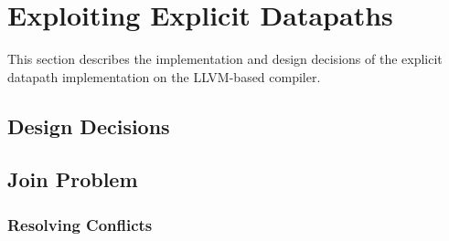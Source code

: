 



\section{Exploiting Explicit Datapaths}\label{sec:expl_bp_impl}
This section describes the implementation and design decisions of the explicit datapath implementation on the LLVM-based compiler.

\subsection{Design Decisions}\label{sec:design_decisions}



\subsection{Join Problem}\label{sec:join_prob}


\subsubsection{Resolving Conflicts}\label{sec:conflicts}


%
